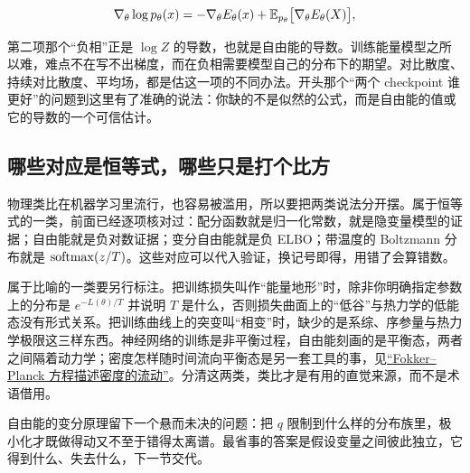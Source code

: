 \[
\nabla_\theta\log p_\theta(x)=-\nabla_\theta E_\theta(x)+\mathbb{E}_{p_\theta}\bigl[\nabla_\theta E_\theta(X)\bigr],
\]

第二项那个``负相''正是 \(\log Z\) 的导数，也就是自由能的导数。训练能量模型之所以难，难点不在写不出梯度，而在负相需要模型自己的分布下的期望。对比散度、持续对比散度、平均场，都是估这一项的不同办法。开头那个``两个 checkpoint 谁更好''的问题到这里有了准确的说法：你缺的不是似然的公式，而是自由能的值或它的导数的一个可信估计。

\subsection{哪些对应是恒等式，哪些只是打个比方}

物理类比在机器学习里流行，也容易被滥用，所以要把两类说法分开摆。属于恒等式的一类，前面已经逐项核对过：配分函数就是归一化常数，就是隐变量模型的证据；自由能就是负对数证据；变分自由能就是负 ELBO；带温度的 Boltzmann 分布就是 \(\operatorname{softmax}(z/T)\)。这些对应可以代入验证，换记号即得，用错了会算错数。

属于比喻的一类要另行标注。把训练损失叫作``能量地形''时，除非你明确指定参数上的分布是 \(e^{-L(\theta)/T}\) 并说明 \(T\) 是什么，否则损失曲面上的``低谷''与热力学的低能态没有形式关系。把训练曲线上的突变叫``相变''时，缺少的是系综、序参量与热力学极限这三样东西。神经网络的训练是非平衡过程，自由能刻画的是平衡态，两者之间隔着动力学；密度怎样随时间流向平衡态是另一套工具的事，见\hyperref[sec:06-Random-Processes/06-Diffusion-and-SDE/02]{``Fokker--Planck 方程描述密度的流动''}。分清这两类，类比才是有用的直觉来源，而不是术语借用。

自由能的变分原理留下一个悬而未决的问题：把 \(q\) 限制到什么样的分布族里，极小化才既做得动又不至于错得太离谱。最省事的答案是假设变量之间彼此独立，它得到什么、失去什么，下一节交代。
